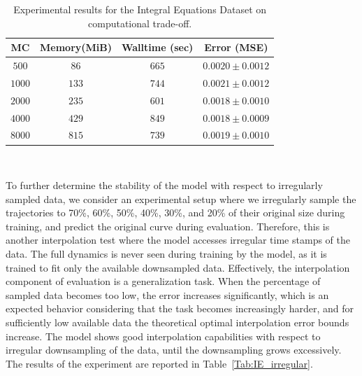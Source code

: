 \documentclass[11pt,fleqn]{amsart} %
\begin{document}
			\begin{table}[h!]
			\centering
			\begin{tabular}{|c | c | c |c|}
					\hline
					MC& Memory(MiB) & Walltime (sec) & Error (MSE) \\
					\hline
					$500$ & $86$ & $665$ & $0.0020 \pm 0.0012$ \\
					\hline
					 $1000$ & $133$ & $744$ & $0.0021 \pm 0.0012$\\
					 \hline
					 $2000$ & $235$ & $601$ & $0.0018 \pm 0.0010$\\
					 \hline
					 $4000$ & $429$ & $849$ & $0.0018 \pm 0.0009$\\
					 \hline
					 $8000$ & $815$ & $739$ & $0.0019 \pm 0.0010$\\
					 \hline
			\end{tabular}
			\caption{Experimental results for the Integral Equations Dataset on computational trade-off.}
			\label{Tab:tradeoff}
		\end{table}\
		
		To further determine the stability of the model with respect to irregularly sampled data, we consider an experimental setup where we irregularly sample the trajectories to 70\%, 60\%, 50\%, 40\%, 30\%, and 20\% of their original size during training, and predict the original curve during evaluation. Therefore, this is another interpolation test where the model accesses irregular time stamps of the data. The full dynamics is never seen during training by the model, as it is trained to fit only the available downsampled data. Effectively, the interpolation component of evaluation is a generalization task. When the percentage of sampled data becomes too low, the error increases significantly, which is an expected behavior considering that the task becomes increasingly harder, and for sufficiently low available data the theoretical optimal interpolation error bounds increase. The model shows good interpolation capabilities with respect to irregular downsampling of the data, until the downsampling grows excessively. The results of the experiment are reported in Table~\ref{Tab:IE_irregular}. 
		
	\begin{table}[h!]
		\centering
	\caption{Experimental results for the Integral Equations Dataset on irregularly sampled interpolation task.}
	\label{Tab:IE_irregular}
	\end{table}\
\end{document}
